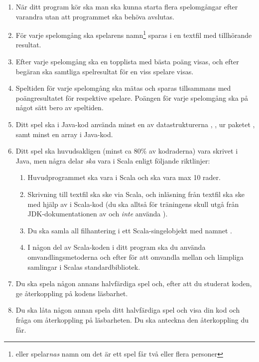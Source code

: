 \begin{enumerate}
  \item När ditt program kör ska man ska kunna starta flera spelomgångar efter varandra utan att programmet ska behöva avslutas.
  \item För varje spelomgång ska spelarens namn\footnote{eller spelar\emph{nas} namn om det är ett spel får två eller flera personer} sparas i en textfil med tillhörande resultat.
  \item Efter varje spelomgång ska en topplista med bästa poäng visas, och efter begäran ska samtliga spelresultat för en viss spelare visas.
  \item Speltiden för varje spelomgång ska mätas och sparas tillsammans med poängresultatet för respektive spelare. Poängen för varje spelomgång ska på något sätt bero av speltiden.
  \item Ditt spel ska i Java-kod använda minst en av datastrukturerna
  ,
  ,
   ur paketet , samt minst en array i Java-kod.
  \item Ditt spel ska huvudsakligen (minst ca 80\% av kodraderna) vara skrivet i Java, men några delar \emph{ska} vara i Scala enligt följande riktlinjer:
  \begin{enumerate}
    \item Huvudprogrammet ska vara i Scala och  ska vara max 10 rader.
    \item Skrivning till textfil ska ske via Scala, och inläsning från textfil ska ske med hjälp av  i Scala-kod (du ska alltså för träningens skull utgå från JDK-dokumentationen av  och \emph{inte} använda ).
    \item Du ska samla all filhantering i ett Scala-singelobjekt med namnet .
    \item I någon del av Scala-koden i ditt program ska du
använda omvandlingsmetoderna  och  efter  för att omvandla mellan  och lämpliga samlingar i Scalas standardbibliotek.
  \end{enumerate}
  \item Du ska spela någon annans halvfärdiga spel och, efter att du studerat koden, ge återkoppling på kodens läsbarhet.
  \item Du ska låta någon annan spela ditt halvfärdiga spel och visa din kod och fråga om återkoppling på läsbarheten. Du ska anteckna den återkoppling du får.

\end{enumerate}
